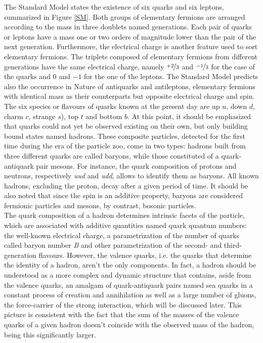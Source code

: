 \documentclass[12pt,a4paper]{report}
\begin{document}
The Standard Model states the existence of six quarks and six leptons, summarized in Figure \ref{SM}. Both groups of elementary fermions are arranged according to the mass in three doublets named generations. Each pair of quarks or leptons have a mass one or two orders of magnitude lower than the pair of the next generation. Furthermore, the electrical charge is another feature used to sort elementary fermions. The triplets composed of elementary fermions from different generations have the same electrical charge, namely $\nicefrac{+2}{3}$ and $\nicefrac{-1}{3}$ for the case of the quarks and $0$ and $-1$ for the one of the leptons. The Standard Model predicts also the occurrence in Nature of antiquarks and antileptons, elementary fermions with identical mass as their counterparts but opposite electrical charge and spin.  \\
The six species or flavours of quarks known at the present day are up $u$, down $d$, charm $c$, strange $s$), top $t$ and bottom $b$. At this point, it should be emphasized that quarks could not yet be observed existing on their own, but only building bound states named hadrons. These composite particles, detected for the first time during the era of the particle zoo, come in two types: hadrons built from three different quarks are called baryons, while those constituted of a quark-antiquark pair mesons. For instance, the quark composition of protons and neutrons, respectively \textit{uud} and \textit{udd}, 
allows to identify them as baryons. All known hadrons, excluding the proton, decay after a given period of time. It should be also noted that since the spin is an additive property, baryons are considered fermionic particles and mesons, by contrast, bosonic particles. \\
The quark composition of a hadron determines intrinsic facets of the particle, which are associated with additive quantities named quark quantum numbers: the well-known electrical charge, a parametrization of the number of quarks called baryon number \textit{B} and other parametrization of the second- and third-generation flavours. However, the valence quarks, i.e. the quarks that determine the identity of a hadron, aren't the only components. In fact, a hadron should be understood as a more complex and dynamic structure that contains, aside from the valence quarks, an amalgam of quark-antiquark pairs named sea quarks in a constant process of creation and annihilation as well as a large number of gluons, the force-carrier of the strong interaction, which will be discussed later. This picture is consistent with the fact that the sum of the masses of the valence quarks of a given hadron doesn't coincide with the observed mass of the hadron, being this significantly larger.  \\
\end{document}
